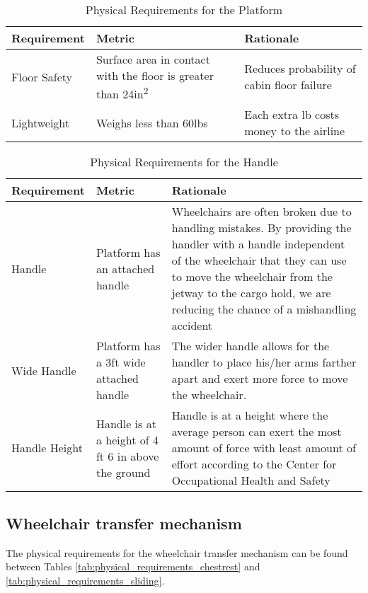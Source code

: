 \begin{table}
\begin{tabular} {| p{4cm} | p{5cm} | p{5cm} |}
\hline
\textbf{Requirement} & \textbf{Metric} & \textbf{Rationale} \\ \hline

Floor Safety  & Surface area in contact with the floor is greater than 24in\textsuperscript{2} &
Reduces probability of cabin floor failure  \\ \hline
Lightweight & Weighs less than 60lbs & Each extra lb costs money to the airline  \\ \hline

\end{tabular} 
\caption{Physical Requirements for the Platform}
\label{tab:physical_requirements_platform}
\end{table}


\clearpage
\newpage

\begin{table}
\begin{tabular} {| p{4cm} | p{5cm} | p{5cm} |}
\hline
\textbf{Requirement} & \textbf{Metric} & \textbf{Rationale} \\ \hline
Handle & Platform has an attached handle & Wheelchairs are often broken due to handling mistakes. By providing the handler with a handle independent of the wheelchair that they can use to move the wheelchair from the jetway to the cargo hold,  we are reducing the chance of a mishandling accident \\ \hline
Wide Handle & Platform has a 3ft wide attached handle & The wider handle allows for the handler to place his/her arms farther apart and exert more force to move the wheelchair. \\ \hline
Handle Height & Handle is at a height of 4 ft 6 in above the ground & Handle is at a height where the average person can exert the most amount of force with least amount of effort according to the Center for Occupational Health and Safety \\ \hline
\end{tabular} 
\caption{Physical Requirements for the Handle}
\label{tab:physical_requirements_handle}
\end{table}

\subsection*{Wheelchair transfer mechanism}
The physical requirements for the wheelchair transfer mechanism can be found between Tables \ref{tab:physical_requirements_chestrest} and \ref{tab:physical_requirements_sliding}.


